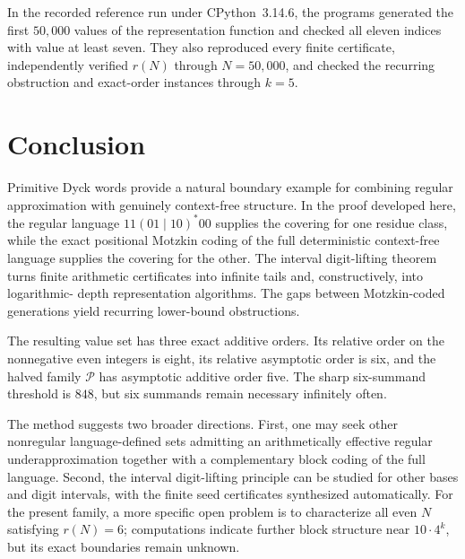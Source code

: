 \documentclass[11pt]{article}
\theoremstyle{plain}
\theoremstyle{definition}
\newcommand{\Pset}{\mathcal P}
\begin{document}
In the recorded reference run under CPython~3.14.6, the programs generated
the first $50{,}000$ values of the representation function and checked all
eleven indices with value at least seven.  They also reproduced every
finite certificate, independently verified $r(N)$ through $N=50{,}000$,
and checked the recurring obstruction and exact-order instances through
$k=5$.
\section{Conclusion}\label{sec:conclusion}

Primitive Dyck words provide a natural boundary example for combining
regular approximation with genuinely context-free structure.  In the
proof developed here, the regular language $11(01\mid10)^*00$ supplies the
covering for one residue class, while the exact positional Motzkin coding
of the full deterministic context-free language supplies the covering for
the other.  The interval digit-lifting theorem turns finite arithmetic
certificates into infinite tails and, constructively, into logarithmic-
depth representation algorithms.  The gaps between Motzkin-coded
generations yield recurring lower-bound obstructions.

The resulting value set has three exact additive orders.  Its relative
order on the nonnegative even integers is eight, its relative asymptotic
order is six, and the halved family $\Pset$ has asymptotic additive order
five.  The sharp six-summand threshold is $848$, but six summands remain
necessary infinitely often.

The method suggests two broader directions.  First, one may seek other
nonregular language-defined sets admitting an arithmetically effective
regular underapproximation together with a complementary block coding of
the full language.  Second, the interval digit-lifting principle can be
studied for other bases and digit intervals, with the finite seed
certificates synthesized automatically.  For the present family, a more
specific open problem is to characterize all even $N$ satisfying
$r(N)=6$; computations indicate further block structure near
$10\cdot4^k$, but its exact boundaries remain unknown.
\end{document}
